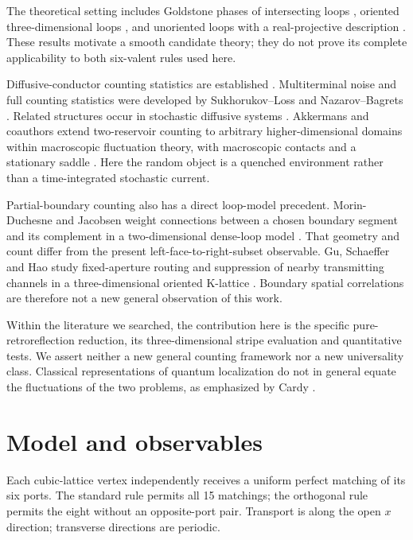 \documentclass[11pt,a4paper]{article}
\begin{document}
The theoretical setting includes Goldstone phases of intersecting loops
\cite{Goldstone}, oriented three-dimensional loops \cite{Nahum2011,Nahum3D},
and unoriented loops with a real-projective description \cite{Serna}.
These results motivate a smooth candidate theory; they do not prove its
complete applicability to both six-valent rules used here.

Diffusive-conductor counting statistics are established
\cite{Beenakker,Nagaev,Blanter,LLY,Nazarov}. Multiterminal noise and full
counting statistics were developed by Sukhorukov--Loss and Nazarov--Bagrets
\cite{SL,SLlong,NB}. Related structures occur in stochastic diffusive systems
\cite{DDR,Bodineau,MFT}. Akkermans and coauthors extend two-reservoir counting
to arbitrary higher-dimensional domains within macroscopic fluctuation theory,
with macroscopic contacts and a stationary saddle \cite{ABDS}.
Here the random object is a quenched environment rather than a
time-integrated stochastic current.

Partial-boundary counting also has a direct loop-model precedent.
Morin-Duchesne and Jacobsen weight connections between a chosen boundary
segment and its complement in a two-dimensional dense-loop model \cite{Morin}.
That geometry and count differ from the present left-face-to-right-subset
observable. Gu, Schaeffer and Hao study fixed-aperture routing and suppression
of nearby transmitting channels in a three-dimensional oriented K-lattice
\cite{Gu}. Boundary spatial correlations are therefore not a new general
observation of this work.

Within the literature we searched, the contribution here is the specific
pure-retroreflection reduction, its three-dimensional stripe evaluation and
quantitative tests. We assert neither a new general counting framework nor
a new universality class. Classical representations of quantum localization
\cite{GLR,Beamond,Ortuno} do not in general equate the fluctuations of the two
problems, as emphasized by Cardy \cite{Cardy}.

\section{Model and observables}
Each cubic-lattice vertex independently receives a uniform perfect matching
of its six ports. The standard rule permits all 15 matchings; the orthogonal
rule permits the eight without an opposite-port pair. Transport is along
the open \(x\) direction; transverse directions are periodic.
\end{document}
